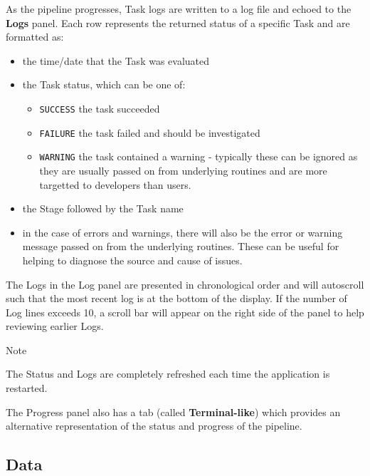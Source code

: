 \documentclass[
  8pt,
  a4paper]{article}
\providecommand{\tightlist}{%
  \setlength{\itemsep}{0pt}\setlength{\parskip}{0pt}}
\begin{document}
As the pipeline progresses, Task logs are written to a log file and
echoed to the \textbf{Logs} panel. Each row represents the returned
status of a specific Task and are formatted as:

\begin{itemize}
\tightlist
\item
  the time/date that the Task was evaluated
\item
  the Task status, which can be one of:

  \begin{itemize}
  \tightlist
  \item
    \texttt{SUCCESS} the task succeeded
  \item
    \texttt{FAILURE} the task failed and should be investigated
  \item
    \texttt{WARNING} the task contained a warning - typically these can
    be ignored as they are usually passed on from underlying routines
    and are more targetted to developers than users.
  \end{itemize}
\item
  the Stage followed by the Task name
\item
  in the case of errors and warnings, there will also be the error or
  warning message passed on from the underlying routines. These can be
  useful for helping to diagnose the source and cause of issues.
\end{itemize}

The Logs in the Log panel are presented in chronological order and will
autoscroll such that the most recent log is at the bottom of the
display. If the number of Log lines exceeds 10, a scroll bar will appear
on the right side of the panel to help reviewing earlier Logs.

\begin{tcolorbox}[enhanced jigsaw, left=2mm, colback=white, leftrule=.75mm, breakable, colframe=quarto-callout-color-frame, arc=.35mm, toprule=.15mm, opacityback=0, rightrule=.15mm, bottomrule=.15mm]

Note

The Status and Logs are completely refreshed each time the application
is restarted.

\end{tcolorbox}

The Progress panel also has a tab (called \textbf{Terminal-like}) which
provides an alternative representation of the status and progress of the
pipeline.

\subsection{Data}\label{sec-data}
\end{document}
